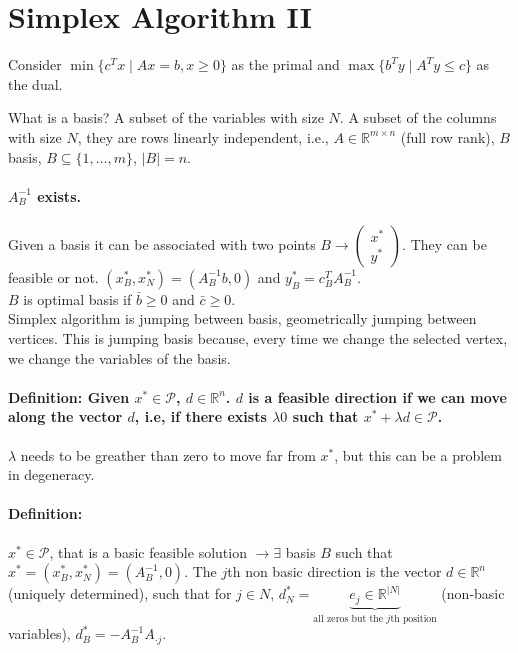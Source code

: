 \documentclass[main]{subfiles}
\begin{document}

\section{Simplex Algorithm II}

Consider $\min \{c^T x\mid Ax = b, x\geq 0\}$ as the primal and $\max \{b^T y
\mid A^T y \leq c\}$ as the dual.

What is a basis? A subset of the variables with size $N$.
A subset of the columns with size $N$, they are rows linearly independent, i.e.,
$A \in \mathbb{R}^{m \times n}$ (full row rank), $B$ basis, $B \subseteq \{1,
\dots, m\}$, $|B| = n$.

\paragraph{$A^{-1}_B$ exists.}
Given a basis it can be associated with two points $B \rightarrow
\begin{pmatrix}
x^*\\
y^*
\end{pmatrix}$.
They can be feasible or not. $(x^*_B, x^*_N) = (A^{-1}_B b, 0)$ and
$y^*_B = c^T_B A^{-1}_B$.\\

$B$ is optimal basis if $\bar{b}\geq 0$ and $\bar{c} \geq 0$.\\

Simplex algorithm is jumping between basis, geometrically jumping between
vertices. This is jumping basis because, every time we change the selected
vertex, we change the variables of the basis.

\paragraph{Definition: Given $x^* \in \mathcal{P}$, $d \in \mathbb{R}^n$.
$d$ is a feasible direction if we can move along the vector $d$, i.e, if there
exists $\lambda  0$ such that $x^* + \lambda d \in \mathcal{P}$.}
$\lambda$ needs to be greather than zero to move far from $x^*$, but this can
be a problem in degeneracy.

\paragraph{Definition:}
$x^* \in \mathcal{P}$, that is a basic feasible solution $\rightarrow \exists$
basis $B$ such that $x^* = (x^*_B, x^*_N) = (A^{-1}_B, 0)$.
The $j$th non basic direction is the vector $d \in \mathbb{R}^n$ (uniquely
determined), such that for $j \in N$, $d^*_N = \underbrace{e_j \in 
\mathbb{R}^{|N|}}_{\text{all zeros but the $j$th position}}$ (non-basic
variables), $d^*_B = -A^{-1}_B A_{\cdot j}$.
\end{document}
